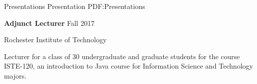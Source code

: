 \documentclass[MMMMyyyy,nonstopmode]{simpleresumecv_stacked}
\begin{document}
\begin{Body}
\iffalse
\hfill
\DatestampYM{1988}{09} --
\DatestampYM{1992}{06}
\fi
\iffalse %
\begin{Detail}
\BulletItem
Senior design project creating reference implementation of DHCP protocol for RFCs 1531 and 1534
\BulletItem
Concentrations in Digital Electronics and Geology

\end{Detail}
\fi %
\fi %

\iffalse %
\Section
{Certifications}
{Certifications}
{PDF:Certifications}

\Entry
\href{https://www.appdynamics.com/certifications/}
{\textbf{AppDynamics Certified Implementations Professional}}
\hfill
\DatestampYM{2016}{11}
\iffalse
\begin{Detail}
\begin{quote}
``An individual who attains the AppDynamics Certified Implementation Professional certification has demonstrated that he or she possesses the minimum acceptable level of knowledge and skills required to deploy AppDynamics Controllers, Agents, EUM Servers and Analytics Servers. 
This individual also has experience using AppDynamics APIs to extend and customize the AppDynamics platform.''
\end{quote}
\end{Detail}
\fi
\fi %



\newif\ifA
\newif\ifB
\newif\ifC
\Afalse
\Bfalse
\Cfalse
\ifA

\Section
{Presentations}%
{Presentation}%
{PDF:Presentations}%

\iffalse      %
\Entry
\textbf{Adjunct Lecturer}
\hfill
Fall 2017

Rochester Institute of Technology
\begin{Detail}
\Item
Lecturer for a class of 30 undergraduate and graduate students for the course ISTE-120, an introduction to Java course for Information Science and Technology majors.
\end{Detail}


\end{Body}
\end{document}
